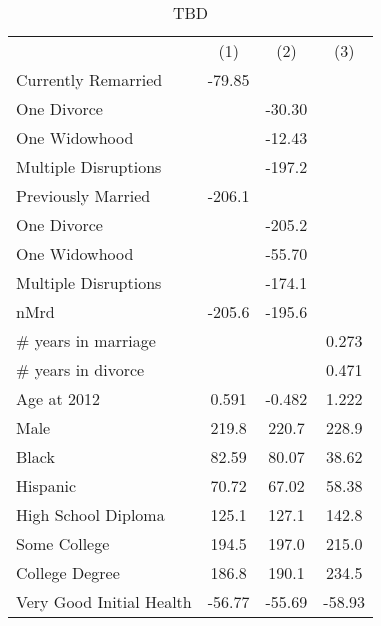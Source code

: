 


\begin{table}[tp]
\footnotesize
\caption{TBD}
\label{tab: SF12 Mental 50}


\begin{tabular}{p{4cm}ccc}
                &\multicolumn{1}{c}{(1)}         &\multicolumn{1}{c}{(2)}         &\multicolumn{1}{c}{(3)}         \\
Currently Remarried&   -79.85\sym{**} &                  &                  \\
One Divorce     &                  &   -30.30         &                  \\
One Widowhood   &                  &   -12.43         &                  \\
Multiple Disruptions&                  &   -197.2\sym{***}&                  \\
Previously Married&   -206.1\sym{***}&                  &                  \\
One Divorce     &                  &   -205.2\sym{***}&                  \\
One Widowhood   &                  &   -55.70         &                  \\
Multiple Disruptions&                  &   -174.1\sym{***}&                  \\
nMrd            &   -205.6\sym{***}&   -195.6\sym{***}&                  \\
# years in marriage&                  &                  &    0.273         \\
# years in divorce&                  &                  &    0.471         \\
Age at 2012     &    0.591         &   -0.482         &    1.222         \\
Male            &    219.8\sym{***}&    220.7\sym{***}&    228.9\sym{***}\\
Black           &    82.59\sym{***}&    80.07\sym{***}&    38.62         \\
Hispanic        &    70.72\sym{**} &    67.02\sym{*}  &    58.38\sym{*}  \\
High School Diploma&    125.1\sym{***}&    127.1\sym{***}&    142.8\sym{***}\\
Some College    &    194.5\sym{***}&    197.0\sym{***}&    215.0\sym{***}\\
College Degree  &    186.8\sym{***}&    190.1\sym{***}&    234.5\sym{***}\\
Very Good Initial Health&   -56.77\sym{*}  &   -55.69\sym{*}  &   -58.93\sym{*}  \\

\end{tabular}
\end{table}
